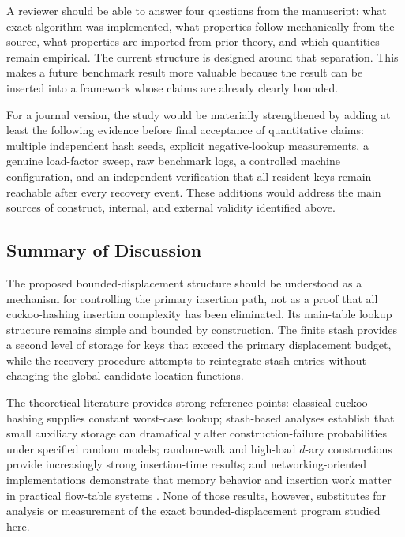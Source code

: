 \documentclass[conference]{IEEEtran}
\begin{document}
A reviewer should be able to answer four questions from the manuscript: what
exact algorithm was implemented, what properties follow mechanically from the
source, what properties are imported from prior theory, and which quantities
remain empirical. The current structure is designed around that separation.
This makes a future benchmark result more valuable because the result can be
inserted into a framework whose claims are already clearly bounded.

For a journal version, the study would be materially strengthened by adding at
least the following evidence before final acceptance of quantitative claims:
multiple independent hash seeds, explicit negative-lookup measurements, a
genuine load-factor sweep, raw benchmark logs, a controlled machine
configuration, and an independent verification that all resident keys remain
reachable after every recovery event. These additions would address the main
sources of construct, internal, and external validity identified above.

\subsection{Summary of Discussion}
\label{subsec:discussion_summary}

The proposed bounded-displacement structure should be understood as a
mechanism for controlling the primary insertion path, not as a proof that all
cuckoo-hashing insertion complexity has been eliminated. Its main-table
lookup structure remains simple and bounded by construction. The finite stash
provides a second level of storage for keys that exceed the primary displacement
budget, while the recovery procedure attempts to reintegrate stash entries
without changing the global candidate-location functions.

The theoretical literature provides strong reference points: classical cuckoo
hashing supplies constant worst-case lookup; stash-based analyses establish
that small auxiliary storage can dramatically alter construction-failure
probabilities under specified random models; random-walk and high-load
$d$-ary constructions provide increasingly strong insertion-time results; and
networking-oriented implementations demonstrate that memory behavior and
insertion work matter in practical flow-table systems
\cite{pagh2004cuckoo,kirsch2009stash,aumuller2014explicit,walzer2022insertion,bell2024constant,kuszmaul2025bubbling,lescouarnec2018cuckoopp,megias2025minimizing}.
None of those results, however, substitutes for analysis or measurement of the
exact bounded-displacement program studied here.
\end{document}

